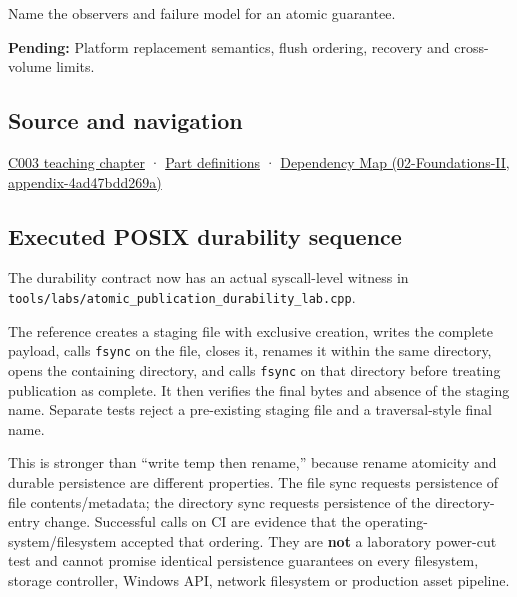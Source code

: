 Name the observers and failure model for an atomic guarantee.

\textbf{Pending:} Platform replacement semantics, flush ordering, recovery and cross-volume limits.

\subsection{Source and navigation}\label{appendix-e89a8f290ef5-source-and-navigation}

\hyperref[01-foundations-i-ch002-where-the-bytes-live]{C003 teaching chapter} · \hyperref[appendix-fd090d982a15-m003---parts-41-60]{Part definitions} · \href{../02-Foundations-II/main.pdf\#nameddest=appendix-4ad47bdd269a}{Dependency Map (02-Foundations-II, appendix-4ad47bdd269a)}

\subsection{Executed POSIX durability sequence}\label{appendix-e89a8f290ef5-executed-posix-durability-sequence}

The durability contract now has an actual syscall-level witness in \texttt{tools/labs/atomic\_publication\_durability\_lab.cpp}.

The reference creates a staging file with exclusive creation, writes the complete payload, calls \texttt{fsync} on the file, closes it, renames it within the same directory, opens the containing directory, and calls \texttt{fsync} on that directory before treating publication as complete. It then verifies the final bytes and absence of the staging name. Separate tests reject a pre-existing staging file and a traversal-style final name.

This is stronger than ``write temp then rename,'' because rename atomicity and durable persistence are different properties. The file sync requests persistence of file contents/metadata; the directory sync requests persistence of the directory-entry change. Successful calls on CI are evidence that the operating-system/filesystem accepted that ordering. They are \textbf{not} a laboratory power-cut test and cannot promise identical persistence guarantees on every filesystem, storage controller, Windows API, network filesystem or production asset pipeline.
